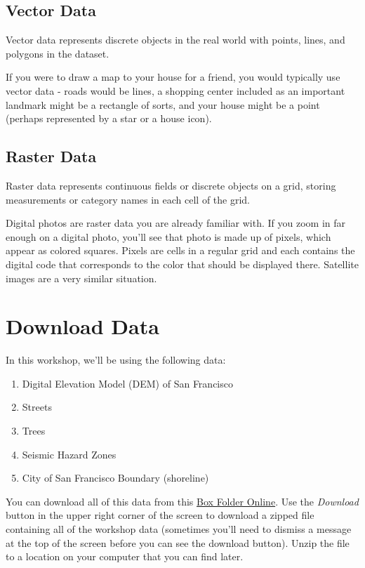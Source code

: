 \documentclass[
]{article}
\providecommand{\tightlist}{%
  \setlength{\itemsep}{0pt}\setlength{\parskip}{0pt}}
\begin{document}
\hypertarget{vector-data}{%
\subsection{Vector Data}\label{vector-data}}

Vector data represents discrete objects in the real world with points, lines, and polygons in the dataset.

If you were to draw a map to your house for a friend, you would typically use vector data - roads would be lines, a shopping center included as an important landmark might be a rectangle of sorts, and your house might be a point (perhaps represented by a star or a house icon).

\hypertarget{raster-data}{%
\subsection{Raster Data}\label{raster-data}}

Raster data represents continuous fields or discrete objects on a grid, storing measurements or category names in each cell of the grid.

Digital photos are raster data you are already familiar with. If you zoom in far enough on a digital photo, you'll see that photo is made up of pixels, which appear as colored squares. Pixels are cells in a regular grid and each contains the digital code that corresponds to the color that should be displayed there. Satellite images are a very similar situation.

\hypertarget{download-data}{%
\section{Download Data}\label{download-data}}

In this workshop, we'll be using the following data:

\begin{enumerate}
\def\labelenumi{\arabic{enumi}.}
\tightlist
\item
  Digital Elevation Model (DEM) of San Francisco
\item
  Streets
\item
  Trees
\item
  Seismic Hazard Zones
\item
  City of San Francisco Boundary (shoreline)
\end{enumerate}

You can download all of this data from this \href{https://ucdavis.box.com/s/cnlz6ejmje4qgf7z80h7ygbwydc65kkm}{Box Folder Online}. Use the \emph{Download} button in the upper right corner of the screen to download a zipped file containing all of the workshop data (sometimes you'll need to dismiss a message at the top of the screen before you can see the download button). Unzip the file to a location on your computer that you can find later.
\end{document}
